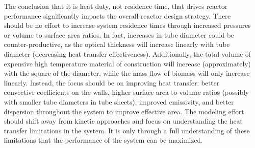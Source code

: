 \documentclass[11pt,twocolumn]{article}
\begin{document}
The conclusion that it is heat duty, not residence time, that drives reactor performance significantly impacts the overall reactor design strategy.  There should be no effort to increase system residence times through increased pressures or volume to surface area ratios.  In fact, increases in tube diameter could be counter-productive, as the optical thickness will increase linearly with tube diameter (decreasing heat transfer effectiveness).  Additionally, the total volume of expensive high temperature material of construction will increase (approximately) with the square of the diameter, while the mass flow of biomass will only increase linearly.  Instead, the focus should be on improving heat transfer: better convective coefficients on the walls, higher surface-area-to-volume ratios (possibly with smaller tube diameters in tube sheets), improved emissivity, and better dispersion throughout the system to improve effective area.  The modeling effort should shift away from kinetic approaches and focus on understanding the heat transfer limitations in the system.  It is only through a full understanding of these limitations that the performance of the system can be maximized.

\newpage
\appendix
\onecolumn
\end{document}
